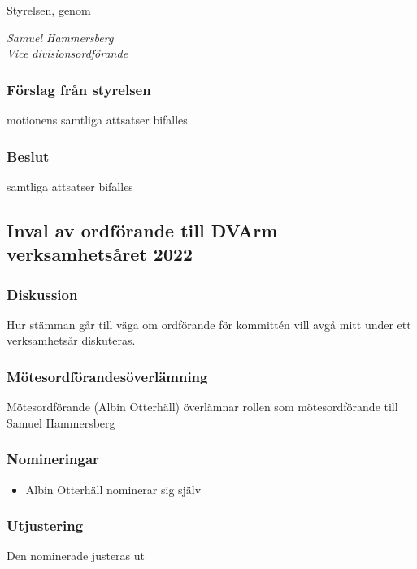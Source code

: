 \documentclass[protokoll]{dvd}
\begin{document}
    Styrelsen, genom

    \emph{Samuel Hammersberg\\Vice divisionsordförande}

    \subsubsection*{Förslag från styrelsen}
        \begin{attsatser}
            \item motionens samtliga attsatser bifalles
        \end{attsatser}

    \subsubsection*{Beslut}
        \begin{attsatser}
            \item samtliga attsatser bifalles
        \end{attsatser}


\subsection{Inval av ordförande till DVArm verksamhetsåret 2022}

\subsubsection*{Diskussion}
Hur stämman går till väga om ordförande för kommittén vill avgå mitt under ett verksamhetsår diskuteras.

        \subsubsection*{Mötesordförandesöverlämning}
        Mötesordförande (Albin Otterhäll) överlämnar rollen som mötesordförande till Samuel Hammersberg

        \subsubsection*{Nomineringar}
            \begin{itemize}
                \item Albin Otterhäll nominerar sig själv
            \end{itemize}

        \subsubsection*{Utjustering}
        Den nominerade justeras ut
\end{document}

